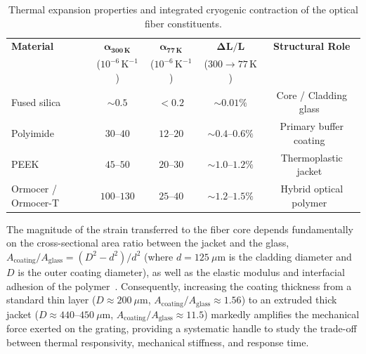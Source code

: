 \documentclass[12pt]{article}
\begin{document}
\begin{table}[htpb]
    \centering
    \footnotesize
    \setlength{\tabcolsep}{4.5pt}
    \caption{Thermal expansion properties and integrated cryogenic contraction of the optical fiber constituents.}
    \label{tab:material_cte}
    \begin{tabular}{lcccc}
        \toprule
        \textbf{Material} & $\boldsymbol{\alpha_{300\,\text{K}}}$ & $\boldsymbol{\alpha_{77\,\text{K}}}$ & $\boldsymbol{\Delta L/L}$ & \textbf{Structural Role} \\
                          & ($10^{-6}\,\text{K}^{-1}$)           & ($10^{-6}\,\text{K}^{-1}$)          & ($300\to 77\,\text{K}$)   &                          \\
        \midrule
        Fused silica        & $\sim 0.5$    & $< 0.2$   & $\sim 0.01\%$       & Core / Cladding glass~\cite{NIST_CryoMaterials} \\
        Polyimide           & $30$--$40$    & $12$--$20$ & $\sim 0.4$--$0.6\%$ & Primary buffer coating~\cite{Zhao2007,NIST_CryoMaterials} \\
        PEEK                & $45$--$50$    & $20$--$30$ & $\sim 1.0$--$1.2\%$ & Thermoplastic jacket~\cite{NIST_CryoMaterials} \\
        Ormocer / Ormocer-T & $100$--$130$  & $25$--$40$ & $\sim 1.2$--$1.5\%$ & Hybrid optical polymer~\cite{Popall1998} \\
        \bottomrule
    \end{tabular}
\end{table}

The magnitude of the strain transferred to the fiber core depends fundamentally on the cross-sectional area ratio between the jacket and the glass, $A_{\text{coating}}/A_{\text{glass}} = (D^2 - d^2)/d^2$ (where $d = 125~\mu\text{m}$ is the cladding diameter and $D$ is the outer coating diameter), as well as the elastic modulus and interfacial adhesion of the polymer~\cite{Bock2004,Zhao2007}. Consequently, increasing the coating thickness from a standard thin layer ($D \approx 200~\mu\text{m}$, $A_{\text{coating}}/A_{\text{glass}} \approx 1.56$) to an extruded thick jacket ($D \approx 440$--$450~\mu\text{m}$, $A_{\text{coating}}/A_{\text{glass}} \approx 11.5$) markedly amplifies the mechanical force exerted on the grating, providing a systematic handle to study the trade-off between thermal responsivity, mechanical stiffness, and response time.


\end{document}
